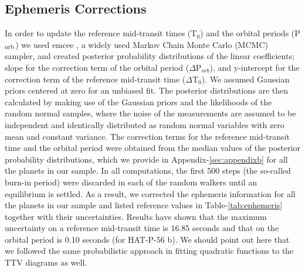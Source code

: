 \documentclass[a4paper,fleqn,usenatbib]{mnras}
\begin{document}
\subsection{Ephemeris Corrections}
\label{subsec:ephemeris}
In order to update the reference mid-transit times (T$_0$) and the orbital periods (P$_{\rm orb}$) we used {\sc emcee} \citep{2013PASP..125..306F}, a widely used Markov Chain Monte Carlo (MCMC) sampler, and created posterior probability distributions of the linear coefficients; slope for the correction term of the orbital period ($\Delta$P$_{orb}$), and y-intercept for the correction term of the reference mid-transit time ($\Delta$T$_0$). We assumed Gaussian priors centered at zero for an unbiased fit. The posterior distributions are then calculated by making use of the Gaussian priors and the likelihoods of the random normal samples, where the noise of the measurements are assumed to be independent and identically distributed as random normal variables with zero mean and constant variance. The correction terms for the reference mid-transit time and the orbital period were obtained from the median values of the posterior probability distributions, which we provide in Appendix-\ref{sec:appendixb} for all the planets in our sample. In all computations, the first 500 steps (the so-called burn-in period) were discarded in each of the random walkers until an equilibrium is settled. As a result, we corrected the ephemeris information for all the planets in our sample and listed reference values in Table-\ref{tab:ephemeris} together with their uncertainties. Results have shown that the maximum uncertainty on a reference mid-transit time is 16.85 seconds and that on the orbital period is 0.10 seconds (for HAT-P-56 b). We should point out here that we followed the same probabilistic approach in fitting quadratic functions to the TTV diagrams as well.
\end{document}
